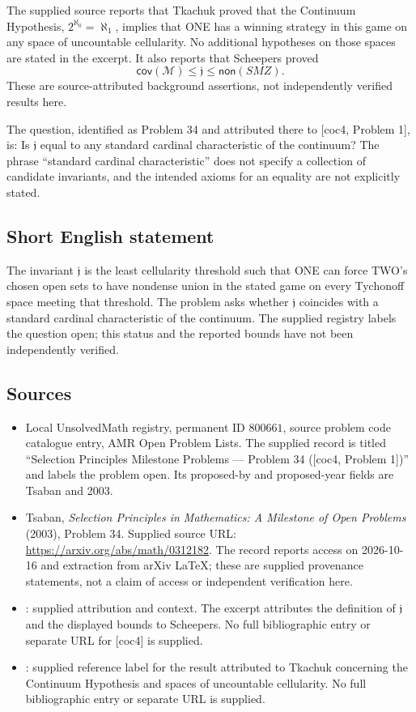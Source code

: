 \documentclass[11pt]{article}
\begin{document}
The supplied source reports that Tkachuk proved that the Continuum Hypothesis, \(2^{\aleph_0}=\aleph_1\), implies that ONE has a winning strategy in this game on any space of uncountable cellularity. No additional hypotheses on those spaces are stated in the excerpt. It also reports that Scheepers proved
\[
\mathsf{cov}(\mathcal M)\leq\mathfrak j\leq\mathsf{non}(SMZ).
\]
These are source-attributed background assertions, not independently verified results here.

The question, identified as Problem 34 and attributed there to [coc4, Problem 1], is: Is \(\mathfrak j\) equal to any standard cardinal characteristic of the continuum? The phrase ``standard cardinal characteristic'' does not specify a collection of candidate invariants, and the intended axioms for an equality are not explicitly stated.
\subsection{Short English statement}
The invariant \(\mathfrak j\) is the least cellularity threshold such that ONE can force TWO's chosen open sets to have nondense union in the stated game on every Tychonoff space meeting that threshold. The problem asks whether \(\mathfrak j\) coincides with a standard cardinal characteristic of the continuum. The supplied registry labels the question open; this status and the reported bounds have not been independently verified.
\subsection{Sources}
\begin{itemize}
\item Local UnsolvedMath registry, permanent ID \(800661\), source problem code catalogue entry, AMR Open Problem Lists. The supplied record is titled ``Selection Principles Milestone Problems --- Problem 34 ([coc4, Problem 1])'' and labels the problem open. Its proposed-by and proposed-year fields are Tsaban and 2003.
\item Tsaban, \emph{Selection Principles in Mathematics: A Milestone of Open Problems} (2003), Problem 34. Supplied source URL: \url{https://arxiv.org/abs/math/0312182}. The record reports access on 2026-10-16 and extraction from arXiv LaTeX; these are supplied provenance statements, not a claim of access or independent verification here.
\item [coc4, Problem 1]: supplied attribution and context. The excerpt attributes the definition of \(\mathfrak j\) and the displayed bounds to Scheepers. No full bibliographic entry or separate URL for [coc4] is supplied.
\item [tkachuk]: supplied reference label for the result attributed to Tkachuk concerning the Continuum Hypothesis and spaces of uncountable cellularity. No full bibliographic entry or separate URL is supplied.
\end{itemize}
\end{document}
